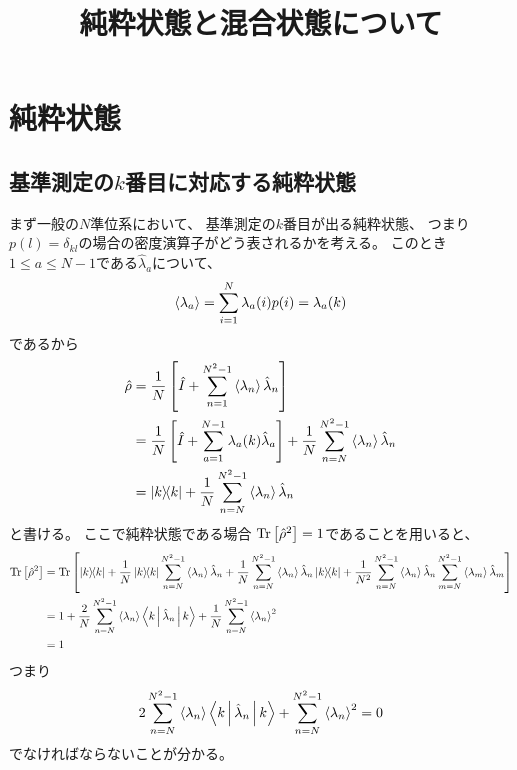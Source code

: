 \documentclass[a4paper, 10pt]{jsarticle}
\title{純粋状態と混合状態について}
\author{}
\begin{document}
\maketitle

\section{純粋状態}
\subsection{基準測定の$k$番目に対応する純粋状態}
まず一般の$N$準位系において、
基準測定の$k$番目が出る純粋状態、
つまり$p(l) = \delta_{kl}$の場合の密度演算子がどう表されるかを考える。
このとき$1 \leq a \leq N-1$である$\hat{\lambda}_a$について、
\begin{align}
	\Braket{\lambda_a}
	= \sum_{i=1}^{N} \lambda_a(i) p(i)
	= \lambda_a (k)
\end{align}
であるから
\begin{align}
	\hat{\rho}
	&= \frac{1}{N} \left[ \hat{I}
	+ \sum_{n=1}^{N^2-1} \Braket{\lambda_n} \hat{\lambda}_n \right] \\
	&= \frac{1}{N} \left[ \hat{I}
	+ \sum_{a=1}^{N-1} \lambda_a (k) \hat{\lambda}_a \right]
	+ \frac{1}{N} \sum_{n=N}^{N^2-1} \Braket{\lambda_n} \hat{\lambda}_n \\
	&= \Ket{k} \! \! \Bra{k}
	+ \frac{1}{N} \sum_{n=N}^{N^2-1} \Braket{\lambda_n} \hat{\lambda}_n
	\label{eq:dens_op_of_k}
\end{align}
と書ける。
ここで純粋状態である場合
$\operatorname*{Tr} \left[ \hat{\rho}^2 \right] = 1$であることを用いると、
\begin{align}
	\operatorname*{Tr} \left[ \hat{\rho}^2 \right]
	&= \operatorname*{Tr} \left[ \Ket{k} \! \! \Bra{k}
	+ \frac{1}{N} \Ket{k} \! \! \Bra{k}
	\sum_{n=N}^{N^2-1} \Braket{\lambda_n} \hat{\lambda}_n
	+ \frac{1}{N} \sum_{n=N}^{N^2-1} \Braket{\lambda_n} \hat{\lambda}_n
	\Ket{k} \! \! \Bra{k}
	+ \frac{1}{N^2} \sum_{n=N}^{N^2-1} \Braket{\lambda_n} \hat{\lambda}_n
	\sum_{m=N}^{N^2-1} \Braket{\lambda_m} \hat{\lambda}_m \right] \\
	&= 1 + \frac{2}{N} \sum_{n=N}^{N^2-1} \Braket{\lambda_n}
	\Braket{k | \hat{\lambda}_n | k}
	+ \frac{1}{N} \sum_{n=N}^{N^2-1} \Braket{\lambda_n}^2 \\
	&= 1
\end{align}
つまり
\begin{align}
	2 \sum_{n=N}^{N^2-1} \Braket{\lambda_n} \Braket{k | \hat{\lambda}_n | k}
	+ \sum_{n=N}^{N^2-1} \Braket{\lambda_n}^2
	= 0
	\label{eq:condition}
\end{align}
でなければならないことが分かる。
\end{document}
